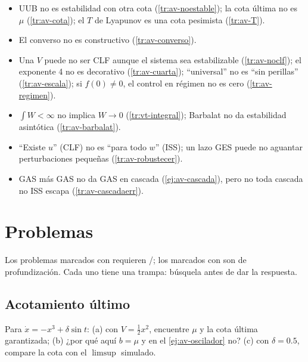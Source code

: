 \begin{trampa}[title={\faBug\hspace{0.45em}Las trampas del capítulo, en una caja}]{}
\begin{itemize}
  \item UUB no es estabilidad con otra cota (\cref{tr:av-noestable}); la cota última no es $\mu$ (\cref{tr:av-cota}); el $T$ de Lyapunov es una cota pesimista (\cref{tr:av-T}).
  \item El converso no es constructivo (\cref{tr:av-converso}).
  \item Una $V$ puede no ser CLF aunque el sistema sea estabilizable (\cref{tr:av-noclf}); el exponente 4 no es decorativo (\cref{tr:av-cuarta}); ``universal'' no es ``sin perillas'' (\cref{tr:av-escala}); si $f(0)\neq0$, el control en régimen no es cero (\cref{tr:av-regimen}).
  \item $\int W<\infty$ no implica $W\to0$ (\cref{tr:vt-integral}); Barbalat no da estabilidad asintótica (\cref{tr:av-barbalat}).
  \item ``Existe $u$'' (CLF) no es ``para todo $w$'' (ISS); un lazo GES puede no aguantar perturbaciones pequeñas (\cref{tr:av-robustecer}).
  \item GAS más GAS no da GAS en cascada (\cref{ej:av-cascada}), pero no toda cascada no ISS escapa (\cref{tr:av-cascadaerr}).
\end{itemize}
\end{trampa}

\section{Problemas}
\label{sec:av-problemas}

Los problemas marcados con \etiquetaM{} requieren \matlab/\simulink; los marcados con \etiquetaEstrella{} son de profundización. Cada uno tiene una trampa: búsquela antes de dar la respuesta.

\subsection*{Acotamiento último}

\begin{problema}\label{prob:av-cubica}
Para $\dot x=-x^3+\delta\sin t$: (a) con $V=\tfrac12x^2$, encuentre $\mu$ y la cota última garantizada; (b) ¿por qué aquí $b=\mu$ y en el \cref{ej:av-oscilador} no? (c) \etiquetaM{} con $\delta=0.5$, compare la cota con el $\limsup$ simulado.
\end{problema}

